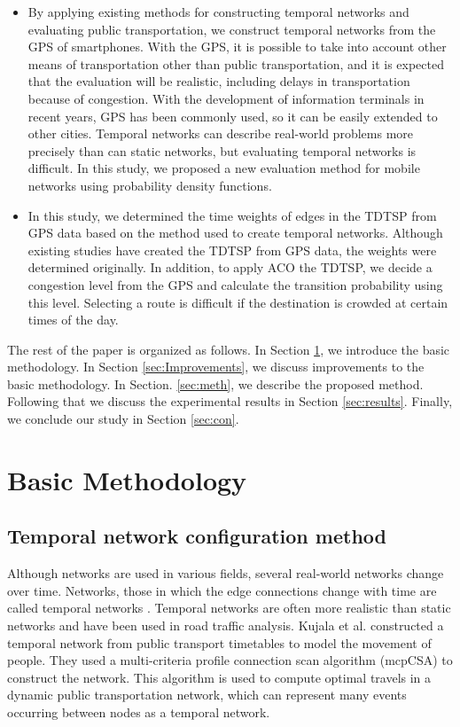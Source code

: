 \documentclass[conference]{IEEEtran}
\begin{document}
\begin{itemize}
	\item By applying existing methods for constructing temporal networks and evaluating public transportation, we construct temporal networks from the GPS of smartphones.
	With the GPS, it is possible to take into account other means of transportation other than public transportation, and it is expected that the evaluation will be realistic, including delays in transportation because of congestion.
	With the development of information terminals in recent years, GPS has been commonly used, so it can be easily extended to other cities.
	Temporal networks can describe real-world problems more precisely than can static networks, but evaluating temporal networks is difficult.
	In this study, we proposed a new evaluation method for mobile networks using probability density functions.
	
	\item In this study, we determined the time weights of edges in the TDTSP from GPS data based on the method used to create temporal networks.
	Although existing studies have created the TDTSP from GPS data, the weights were determined originally.
	In addition, to apply ACO the TDTSP, we decide a congestion level from the GPS and calculate the transition probability using this level.
	Selecting a route is difficult if the destination is crowded at certain times of the day.
\end{itemize}

\par The rest of the paper is organized as follows. 
In Section \ref{sec:Methodology}, we introduce the basic methodology.
In Section \ref{sec:Improvements}, we discuss improvements to the basic methodology.
In Section. \ref{sec:meth}, we describe the proposed method.
Following that we discuss the experimental results in Section \ref{sec:results}.
Finally, we conclude our study in Section \ref{sec:con}.

\section{Basic Methodology}
\label{sec:Methodology}
\subsection {Temporal network configuration method}
\par Although networks are used in various fields, several real-world networks change over time.
Networks, those in which the edge connections change with time are called temporal networks \cite{holme2012temporal}.
Temporal networks are often more realistic than static networks and have been used in road traffic analysis.
Kujala et al. \cite{kujala2018travel} constructed a temporal network from public transport timetables to model the movement of people.
They used a multi-criteria profile connection scan algorithm (mcpCSA) to construct the network.
This algorithm is used to compute optimal travels in a dynamic public transportation network, which can represent many events occurring between nodes as a temporal network.
\end{document}
